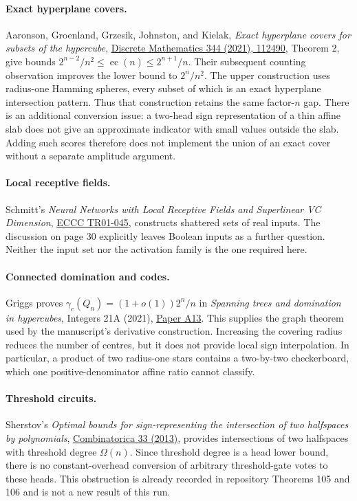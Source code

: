 \documentclass[11pt]{article}
\begin{document}
\paragraph{Exact hyperplane covers.}
Aaronson, Groenland, Grzesik, Johnston, and Kielak,
\emph{Exact hyperplane covers for subsets of the hypercube},
\href{https://tomjohnston.co.uk/papers/exact-hyperplane-covers-for-subsets-of-the-hypercube.pdf}{Discrete Mathematics 344 (2021), 112490},
Theorem 2, give bounds $2^{n-2}/n^2\le\operatorname{ec}(n)\le2^{n+1}/n$.
Their subsequent counting observation improves the lower bound to
$2^n/n^2$. The upper construction uses radius-one Hamming spheres,
every subset of which is an exact hyperplane intersection pattern.
Thus that construction retains the same factor-$n$ gap.
There is an additional conversion issue: a two-head sign representation
of a thin affine slab does not give an approximate indicator with small
values outside the slab. Adding such scores therefore does not implement
the union of an exact cover without a separate amplitude argument.

\paragraph{Local receptive fields.}
Schmitt's \emph{Neural Networks with Local Receptive Fields and
Superlinear VC Dimension},
\href{https://eccc.weizmann.ac.il/report/2001/045/download/}{ECCC TR01-045},
constructs shattered sets of real inputs. The discussion on page 30
explicitly leaves Boolean inputs as a further question. Neither the
input set nor the activation family is the one required here.

\paragraph{Connected domination and codes.}
Griggs proves $\gamma_c(Q_n)=(1+o(1))2^n/n$ in
\emph{Spanning trees and domination in hypercubes}, Integers 21A (2021),
\href{https://math.colgate.edu/~integers/graham13/graham13.pdf}{Paper A13}.
This supplies the graph theorem used by the manuscript's derivative
construction. Increasing the covering radius reduces the number of
centres, but it does not provide local sign interpolation. In particular,
a product of two radius-one stars contains a two-by-two checkerboard,
which one positive-denominator affine ratio cannot classify.

\paragraph{Threshold circuits.}
Sherstov's \emph{Optimal bounds for sign-representing the intersection
of two halfspaces by polynomials},
\href{https://web.cs.ucla.edu/~sherstov/pdf/opthshs.pdf}{Combinatorica 33 (2013)},
provides intersections of two halfspaces with threshold degree
$\Omega(n)$. Since threshold degree is a head lower bound, there is
no constant-overhead conversion of arbitrary threshold-gate votes to
these heads. This obstruction is already recorded in repository
Theorems 105 and 106 and is not a new result of this run.
\end{document}
